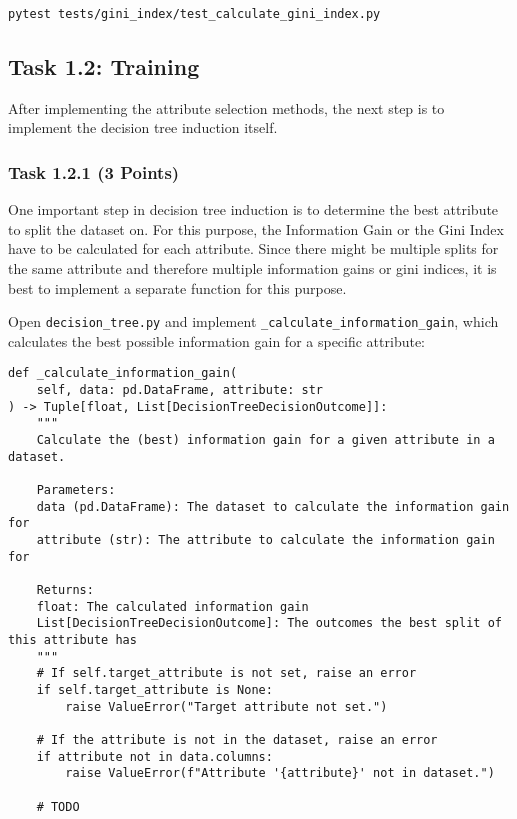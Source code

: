 \documentclass[
english,
smallborders
]{i6prcsht}
\newcommand{\points}[1]{\hfill \color{red}(#1 Points)\color{black}}
\begin{document}
\vspace*{0.3cm}

\begin{lstlisting}
pytest tests/gini_index/test_calculate_gini_index.py
\end{lstlisting}

\vspace*{0.1cm}

\subsection*{Task 1.2: Training}

After implementing the attribute selection methods, the next step is to implement the decision tree induction itself.

\subsubsection*{Task 1.2.1 \points{3}}

One important step in decision tree induction is to determine the best attribute to split the dataset on. For this purpose, the Information Gain or the Gini Index have to be calculated for each attribute. Since there might be multiple splits for the same attribute and therefore multiple information gains or gini indices, it is best to implement a separate function for this purpose.

Open \texttt{decision\_tree.py} and implement \texttt{\_calculate\_information\_gain}, which calculates the best possible information gain for a specific attribute:

\vspace*{0.3cm}

\begin{lstlisting}
def _calculate_information_gain(
	self, data: pd.DataFrame, attribute: str
) -> Tuple[float, List[DecisionTreeDecisionOutcome]]:
	"""
	Calculate the (best) information gain for a given attribute in a dataset.

	Parameters:
	data (pd.DataFrame): The dataset to calculate the information gain for
	attribute (str): The attribute to calculate the information gain for

	Returns:
	float: The calculated information gain
	List[DecisionTreeDecisionOutcome]: The outcomes the best split of this attribute has
	"""
	# If self.target_attribute is not set, raise an error
	if self.target_attribute is None:
		raise ValueError("Target attribute not set.")

	# If the attribute is not in the dataset, raise an error
	if attribute not in data.columns:
		raise ValueError(f"Attribute '{attribute}' not in dataset.")

	# TODO
\end{lstlisting}
\end{document}
